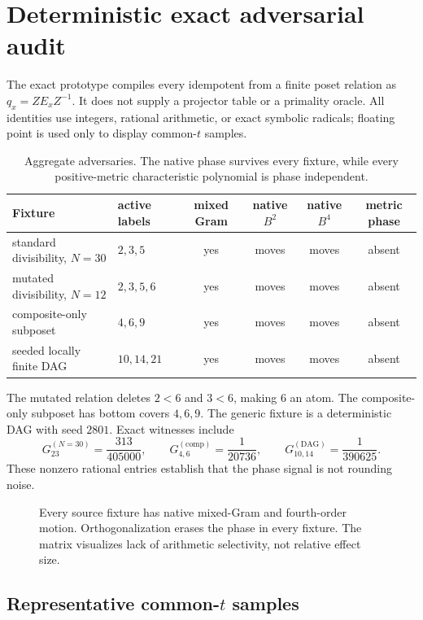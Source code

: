 \section{Deterministic exact adversarial audit}
\label{sec:audit}

The exact prototype compiles every idempotent from a finite poset
relation as $q_x=ZE_xZ^{-1}$.  It does not supply a projector table or
a primality oracle.  All identities use integers, rational arithmetic,
or exact symbolic radicals; floating point is used only to display
common-$t$ samples.

\begin{table}[t]
\centering
\small
\begin{tabular}{L{3.6cm}L{2.5cm}cccc}
\toprule
Fixture & active labels & mixed Gram & native $B^2$ & native $B^4$
& metric phase\\
\midrule
standard divisibility, $N=30$ & $2,3,5$ & yes & moves & moves & absent\\
mutated divisibility, $N=12$ & $2,3,5,6$ & yes & moves & moves & absent\\
composite-only subposet & $4,6,9$ & yes & moves & moves & absent\\
seeded locally finite DAG & $10,14,21$ & yes & moves & moves & absent\\
\bottomrule
\end{tabular}
\caption{Aggregate adversaries.  The native phase survives every
fixture, while every positive-metric characteristic polynomial is
phase independent.}
\label{tab:controls}
\end{table}

The mutated relation deletes $2<6$ and $3<6$, making $6$ an atom.
The composite-only subposet has bottom covers $4,6,9$.  The generic
fixture is a deterministic DAG with seed $2801$.  Exact witnesses
include
\[
 G_{23}^{(N=30)}=\frac{313}{405000},\qquad
 G_{4,6}^{(\mathrm{comp})}=\frac1{20736},\qquad
 G_{10,14}^{(\mathrm{DAG})}=\frac1{390625}.
\]
These nonzero rational entries establish that the phase signal is not
rounding noise.

\begin{figure}[t]
\centering

\caption{Every source fixture has native mixed-Gram and fourth-order
motion.  Orthogonalization erases the phase in every fixture.  The
matrix visualizes lack of arithmetic selectivity, not relative effect
size.}
\label{fig:controls}
\end{figure}

\subsection{Representative common-\texorpdfstring{$t$}{t} samples}

